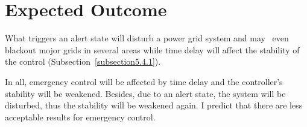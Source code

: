 \section{Expected Outcome} %

What triggers an alert state will disturb a power grid system and may~\cite{andersson2005causes} even blackout mojor grids in several areas while time delay will affect the stability of the control (Subsection~\ref{subsection5.4.1}).

In all, emergency control will be affected by time delay and the controller's stability will be weakened. Besides, due to an alert state, the system will be disturbed, thus the stability will be weakened again. I predict that there are less acceptable results for emergency control.